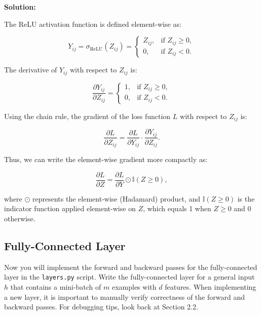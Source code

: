 \documentclass{article}
\newenvironment{solution}{\color{blue} \smallskip \textbf{Solution:}}{}
\begin{document}
\begin{solution}


The ReLU activation function is defined element-wise as:

\[
Y_{ij} = \sigma_{\text{ReLU}}(Z_{ij}) =
\begin{cases}
Z_{ij}, & \text{if } Z_{ij} \geq 0, \\
0, & \text{if } Z_{ij} < 0.
\end{cases}
\]

The derivative of \(Y_{ij}\) with respect to \(Z_{ij}\) is:

\[
\frac{\partial Y_{ij}}{\partial Z_{ij}} =
\begin{cases}
1, & \text{if } Z_{ij} \geq 0, \\
0, & \text{if } Z_{ij} < 0.
\end{cases}
\]

Using the chain rule, the gradient of the loss function \(L\) with respect to \(Z_{ij}\) is:

\[
\frac{\partial L}{\partial Z_{ij}} = \frac{\partial L}{\partial Y_{ij}} \cdot \frac{\partial Y_{ij}}{\partial Z_{ij}}.
\]

Thus, we can write the element-wise gradient more compactly as:

\[
\frac{\partial L}{\partial Z} = \frac{\partial L}{\partial Y} \odot \mathbb{I}(Z \geq 0),
\]

where \(\odot\) represents the element-wise (Hadamard) product, and \(\mathbb{I}(Z \geq 0)\) is the indicator function applied element-wise on \(Z\), which equals 1 when \(Z \geq 0\) and 0 otherwise.



\end{solution}

\newpage
\subsection{Fully-Connected Layer}
Now you will implement the forward and backward passes for the fully-connected layer in the \texttt{layers.py} script. 
Write the fully-connected layer for a general input $h$ that contains a mini-batch of $m$ examples with $d$ features. 
When implementing a new layer, it is important to manually verify correctness of the forward and backward passes. For debugging tips, look back at Section 2.2.
\end{document}

